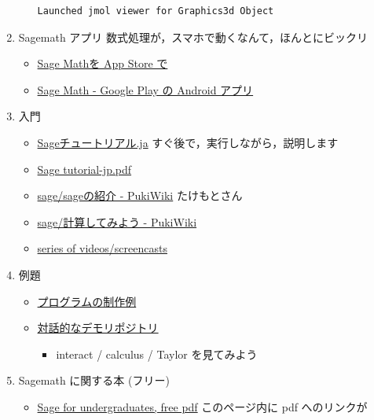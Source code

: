 \documentclass[dvipdfmx,11pat]{jarticle}
\begin{document}
\begin{enumerate}
\begin{enumerate}
\label{org102810d}
\begin{verbatim}
Launched jmol viewer for Graphics3d Object
\end{verbatim}
\end{enumerate}
\item Sagemath アプリ
\label{sec:orgea3933e}
数式処理が，スマホで動くなんて，ほんとにビックリ
\begin{itemize}
\item \href{https://itunes.apple.com/jp/app/sage-math/id496492945?mt=8}{Sage Mathを App Store で}
\item \href{https://play.google.com/store/apps/details?id=org.sagemath.droid\&hl=ja}{Sage Math - Google Play の Android アプリ}
\end{itemize}
\item 入門
\label{sec:org794941a}
\begin{itemize}
\item \href{http://doc.sagemath.org/html/ja/tutorial/index.html}{Sageチュートリアル.ja} すぐ後で，実行しながら，説明します
\item \href{http://doc.sagemath.org/pdf/ja/tutorial/tutorial-jp.pdf}{Sage tutorial-jp.pdf}
\item \href{http://www.pwv.co.jp/\%7Etake/TakeWiki/index.php?sage\%2Fsage\%E3\%81\%AE\%E7\%B4\%B9\%E4\%BB\%8B}{sage/sageの紹介 - PukiWiki} たけもとさん
\item \href{http://www.pwv.co.jp/\~take/TakeWiki/index.php?sage\%2F\%E8\%A8\%88\%E7\%AE\%97\%E3\%81\%97\%E3\%81\%A6\%E3\%81\%BF\%E3\%82\%88\%E3\%81\%86}{sage/計算してみよう - PukiWiki}
\item \href{http://www.sagemath.org/help-video.html}{series of videos/screencasts}
\end{itemize}
\item 例題
\label{sec:org5867796}
\begin{itemize}
\item \href{http://doc.sagemath.org/html/en/constructions/index.html}{プログラムの制作例}
\item \href{https://wiki.sagemath.org/interact}{対話的なデモリポジトリ} 
\begin{itemize}
\item interact / calculus / Taylor  を見てみよう
\end{itemize}
\end{itemize}
\item Sagemath に関する本 (フリー)
\label{sec:org359735e}
\begin{itemize}
\item \href{http://www.gregorybard.com/Sage.html}{Sage for undergraduates, free pdf}   このページ内に pdf へのリンクが

\end{itemize}
\end{enumerate}
\end{document}
